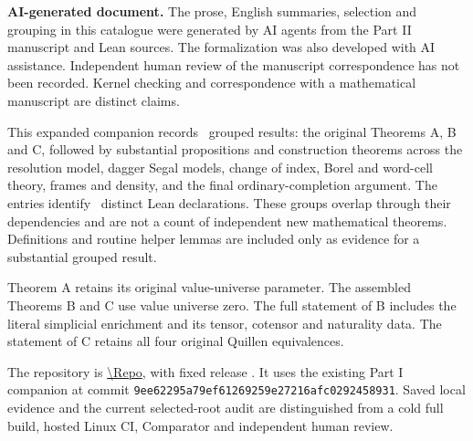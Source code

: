 \noindent\textbf{AI-generated document.}
The prose, English summaries, selection and grouping in this catalogue were
generated by AI agents from the Part II manuscript and Lean sources.
The formalization was also developed with AI assistance.
Independent human review of the manuscript correspondence has not been recorded.
Kernel checking and correspondence with a mathematical manuscript are distinct
claims.

\medskip
This expanded companion records \CatalogueCount\ grouped results:
the original Theorems A, B and C, followed by substantial propositions and
construction theorems across the resolution model, dagger Segal models,
change of index, Borel and word-cell theory, frames and density, and the final
ordinary-completion argument.
The entries identify \CatalogueDeclarationCount\ distinct Lean declarations.
These groups overlap through their dependencies and are not a count of
independent new mathematical theorems.
Definitions and routine helper lemmas are included only as evidence for a
substantial grouped result.

Theorem A retains its original value-universe parameter.
The assembled Theorems B and C use value universe zero.
The full statement of B includes the literal simplicial enrichment and its
tensor, cotensor and naturality data.
The statement of C retains all four original Quillen equivalences.

The repository is \url{\Repo}, with fixed release \texttt{\CompanionTag}.
It uses the existing Part I companion at commit
\nolinkurl{9ee62295a79ef61269259e27216afc0292458931}.
Saved local evidence and the current selected-root audit are distinguished from
a cold full build, hosted Linux CI, Comparator and independent human review.
